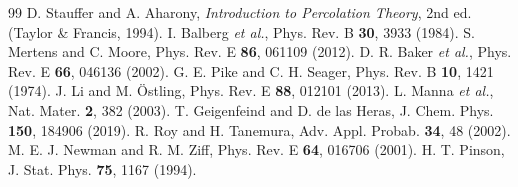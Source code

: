 \documentclass[autodetect-engine,ja=standard,a4paper,twocolumn,10pt]{bxjsarticle}
\theoremstyle{plain}
\begin{document}
\begin{thebibliography}{99}\small
{} D. Stauffer and A. Aharony, \textit{Introduction to Percolation Theory}, 2nd ed. (Taylor \& Francis, 1994).
 I. Balberg \textit{et al.}, Phys. Rev. B \textbf{30}, 3933 (1984).
 S. Mertens and C. Moore, Phys. Rev. E \textbf{86}, 061109 (2012).
 D. R. Baker \textit{et al.}, Phys. Rev. E \textbf{66}, 046136 (2002).
 G. E. Pike and C. H. Seager, Phys. Rev. B \textbf{10}, 1421 (1974).
 J. Li and M. \"Ostling, Phys. Rev. E \textbf{88}, 012101 (2013).
 L. Manna \textit{et al.}, Nat. Mater. \textbf{2}, 382 (2003).
 T. Geigenfeind and D. de las Heras, J. Chem. Phys. \textbf{150}, 184906 (2019).
 R. Roy and H. Tanemura, Adv. Appl. Probab. \textbf{34}, 48 (2002).
 M. E. J. Newman and R. M. Ziff, Phys. Rev. E \textbf{64}, 016706 (2001).
 H. T. Pinson, J. Stat. Phys. \textbf{75}, 1167 (1994).
\end{thebibliography}
\end{document}
